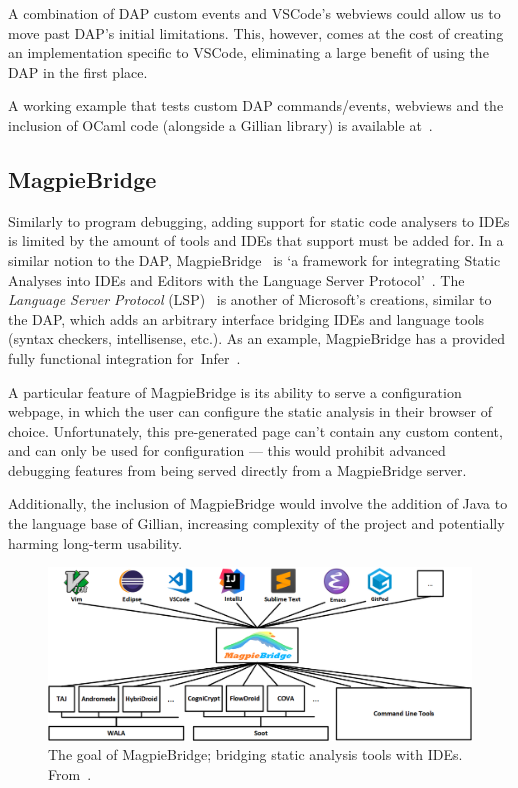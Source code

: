 \label{sec:background:extending-dap}
A combination of DAP custom events and VSCode's webviews could allow us to move
past DAP's initial limitations. This, however, comes at the cost of creating an
implementation specific to VSCode, eliminating a large benefit of using the DAP
in the first place.

A working example that tests custom DAP commands/events, webviews and the
inclusion of OCaml code (alongside a Gillian library) is available
at~\cite{debugger-experiment}.

\subsection{MagpieBridge}\label{sec:background:magpiebridge}

Similarly to program debugging, adding support for static code analysers to IDEs
is limited by the amount of tools and IDEs that support must be added for. In a
similar notion to the DAP, MagpieBridge~\cite{magpiebridge} is `a framework for
integrating Static Analyses into IDEs and Editors with the Language Server
Protocol'~\cite{magpiebridge-repo}. The \textit{Language Server Protocol}
(LSP)~\cite{lsp} is another of Microsoft's creations, similar to the DAP, which
adds an arbitrary interface bridging IDEs and language tools (syntax checkers,
intellisense, etc.). As an example, MagpieBridge has a provided fully
functional integration for~Infer~\cite{infer-ide}.

A particular feature of MagpieBridge is its ability to serve a configuration
webpage, in which the user can configure the static analysis in their browser
of choice. Unfortunately, this pre-generated page can't contain any custom
content, and can only be used for configuration --- this would prohibit advanced
debugging features from being served directly from a MagpieBridge server.

Additionally, the inclusion of MagpieBridge would involve the addition of Java
to the language base of Gillian, increasing complexity of the project and
potentially harming long-term usability.


\begin{figure}
  \centering
  \includegraphics[width=\textwidth]{img/magpiebridge-goal.png}
  \caption{
    The goal of MagpieBridge; bridging static analysis tools with IDEs.
    From~\cite{magpiebridge-repo}.
  }\label{fig:magpiebridge-goal}
\end{figure}
